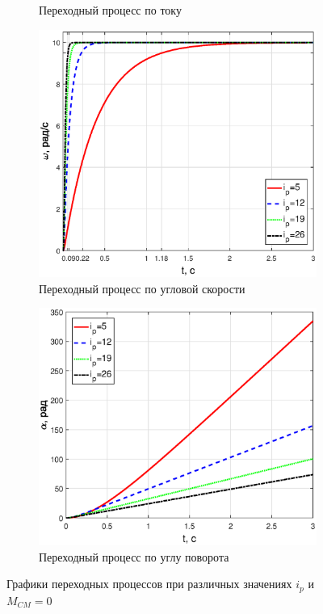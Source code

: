 \documentclass[12pt,a4paper]{article}
\begin{document}
\begin{figure}[H]
\begin{subfigure}[b]{0.48\textwidth}
		\caption{Переходный процесс по току}
	\end{subfigure}
	\begin{subfigure}[b]{0.48\textwidth}
		\includegraphics[width = \textwidth]{w3_0}
		\caption{Переходный процесс по угловой скорости}
	\end{subfigure}
	\hfill
	\begin{subfigure}[b]{0.48\textwidth}
		\includegraphics[width = \textwidth]{a3_0}
		\caption{Переходный процесс по углу поворота}
	\end{subfigure}
	\caption{Графики переходных процессов при различных значениях $i_p$ и $M_{CM}=0$}
	\label{UIwa00}
\end{figure}
\end{document}
